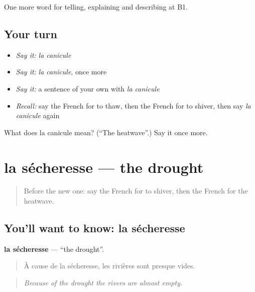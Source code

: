 \begin{grammarlens}[title={What you've built}]
One more word for telling, explaining and describing at B1.
\end{grammarlens}

\subsection*{Your turn}
\begin{itemize}
\raggedright
  \item \emph{Say it:} \emph{la canicule}
  \item \emph{Say it:} \emph{la canicule}, once more
  \item \emph{Say it:} a sentence of your own with \emph{la canicule}
  \item \emph{Recall:} say the French for to thaw, then the French for to shiver, then say \emph{la canicule} again
\end{itemize}

\begin{tcolorbox}[breakable,colback=teal!4,colframe=teal!35!black,title={Before you move on}]
What does la canicule mean? (\textquotedblleft{}The heatwave\textquotedblright{}.) Say it once more.
\end{tcolorbox}
\section[la sécheresse]{la sécheresse — the drought}

\label{lesson:FR-C464-secheresse}



\begin{quote}
Before the new one: say the French for to shiver, then the French for the heatwave.
\end{quote}

\subsection*{You'll want to know: la sécheresse}
\textbf{la sécheresse} — \textquotedblleft{}the drought\textquotedblright{}.

\begin{quote}
À cause de la sécheresse, les rivières sont presque vides.
\end{quote}

\begin{quote}
\emph{Because of the drought the rivers are almost empty.}
\end{quote}

